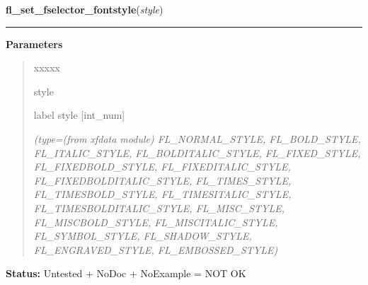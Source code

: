 \hspace{.8\funcindent}\begin{boxedminipage}{\funcwidth}

    \raggedright \textbf{fl\_set\_fselector\_fontstyle}(\textit{style})

    \vspace{-1.5ex}

    \rule{\textwidth}{0.5\fboxrule}
\setlength{\parskip}{2ex}
\setlength{\parskip}{1ex}
      \textbf{Parameters}
      \vspace{-1ex}

      \begin{quote}
        \begin{Ventry}{xxxxx}

          \item[style]

          label style [int\_num]

            {\it (type=(from xfdata module) FL\_NORMAL\_STYLE, FL\_BOLD\_STYLE, FL\_ITALIC\_STYLE,
FL\_BOLDITALIC\_STYLE, FL\_FIXED\_STYLE, FL\_FIXEDBOLD\_STYLE, 
FL\_FIXEDITALIC\_STYLE, FL\_FIXEDBOLDITALIC\_STYLE, FL\_TIMES\_STYLE, 
FL\_TIMESBOLD\_STYLE, FL\_TIMESITALIC\_STYLE, FL\_TIMESBOLDITALIC\_STYLE, 
FL\_MISC\_STYLE, FL\_MISCBOLD\_STYLE, FL\_MISCITALIC\_STYLE, 
FL\_SYMBOL\_STYLE, FL\_SHADOW\_STYLE, FL\_ENGRAVED\_STYLE, 
FL\_EMBOSSED\_STYLE)}

        \end{Ventry}

      \end{quote}

\textbf{Status:} Untested + NoDoc + NoExample = NOT OK



    \end{boxedminipage}

    \label{xformslib:library:fl_set_fselector_placement}

    \vspace{0.5ex}

